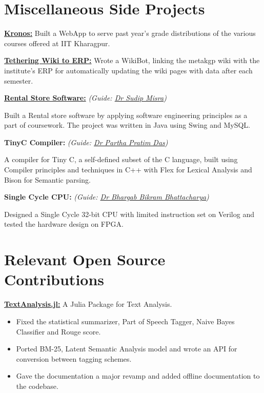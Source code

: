 \documentclass[a4paper,10pt]{extarticle} %
\begin{document}
\section{\textcolor{primary}{Miscellaneous Side Projects}}

\textbf{\href{https://github.com/metakgp/kronos}{Kronos:}} Built a WebApp to serve past year's grade distributions of the various courses offered at IIT Kharagpur. 

\textbf{\href{https://github.com/metakgp/twerp}{Tethering Wiki to ERP:}} Wrote a WikiBot, linking the metakgp wiki with the institute's ERP for automatically updating the wiki pages with data after each semester.

\textbf{\href{https://github.com/Ayushk4/Rental-Store-Software}{Rental Store Software:}}
\textit{(Guide: \href{https://cse.iitkgp.ac.in/~smisra/}{Dr Sudip Misra})}

Built a Rental store software by applying software engineering principles as a part of coursework. The project was written in Java using Swing and MySQL.

\textbf{TinyC Compiler:} \textit{(Guide: \href{https://www.linkedin.com/in/ppdas}{Dr Partha Pratim Das})} 

A compiler for Tiny C, a self-defined subset of the C language, built using Compiler principles and techniques in C++ with Flex for Lexical Analysis and Bison for Semantic parsing.

\textbf{Single Cycle CPU:} \textit{(Guide: \href{https://www.linkedin.com/in/bhargab-b-bhattacharya-06530132/}{Dr Bhargab Bikram Bhattacharya})} 

Designed a Single Cycle 32-bit CPU with limited instruction set on Verilog and tested the hardware design on FPGA.\\



\vspace{-0.3cm}
\section{\textcolor{primary}{Relevant Open Source Contributions}}

\textbf{\href{https://github.com/JuliaText/TextAnalysis.jl}{TextAnalysis.jl:}} A Julia Package for Text Analysis.
    \begin{itemize}[leftmargin=.2in]
        \item Fixed the statistical summarizer, Part of Speech Tagger, Naive Bayes Classifier and Rouge score.
        \item Ported BM-25, Latent Semantic Analysis model and wrote an API for conversion between tagging
        schemes.
        \item Gave the documentation a major revamp and added offline documentation to the codebase.
    \end{itemize}
\end{document}
